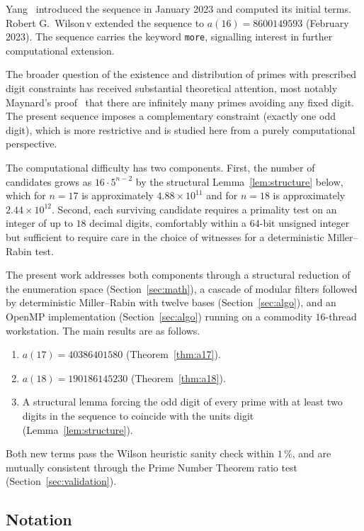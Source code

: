 \documentclass[11pt,a4paper]{article}
\theoremstyle{definition}
\begin{document}
Yang~\cite{Yang-A359813} introduced the sequence in January 2023 and
computed its initial terms. Robert G.\ Wilson\,v extended the sequence
to $a(16) = \num{8600149593}$ (February 2023). The sequence carries the keyword
\texttt{more}, signalling interest in further computational extension.

The broader question of the existence and distribution of primes with
prescribed digit constraints has received substantial theoretical attention,
most notably Maynard's proof~\cite{Maynard2019} that there are infinitely
many primes avoiding any fixed digit. The present sequence imposes a
complementary constraint (exactly one odd digit), which is more restrictive
and is studied here from a purely computational perspective.

The computational difficulty has two components. First, the number of
candidates grows as $16 \cdot 5^{n-2}$ by the structural Lemma~\ref{lem:structure}
below, which for $n=17$ is approximately $4.88 \times 10^{11}$ and for
$n=18$ is approximately $2.44 \times 10^{12}$. Second, each surviving
candidate requires a primality test on an integer of up to $18$ decimal
digits, comfortably within a $64$-bit unsigned integer but sufficient to
require care in the choice of witnesses for a deterministic Miller--Rabin
test.

The present work addresses both components through a structural reduction
of the enumeration space (Section~\ref{sec:math}), a cascade of modular
filters followed by deterministic Miller--Rabin with twelve bases
(Section~\ref{sec:algo}), and an OpenMP implementation
(Section~\ref{sec:algo}) running on a commodity $16$-thread workstation.
The main results are as follows.

\begin{enumerate}
  \item $a(17) = \num{40386401580}$
    (Theorem~\ref{thm:a17}).
  \item $a(18) = \num{190186145230}$
    (Theorem~\ref{thm:a18}).
  \item A structural lemma forcing the odd digit of every prime with at least
    two digits in the sequence to coincide with the units digit
    (Lemma~\ref{lem:structure}).
\end{enumerate}

Both new terms pass the Wilson heuristic sanity check within $1\,\%$, and
are mutually consistent through the Prime Number Theorem ratio test
(Section~\ref{sec:validation}).

\subsection{Notation}
\end{document}
